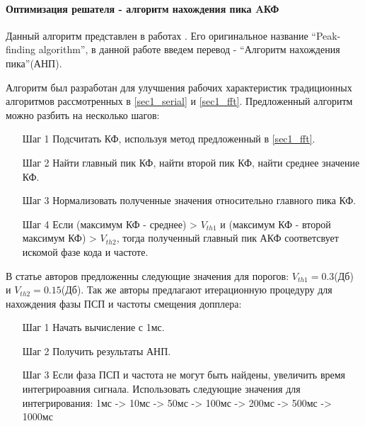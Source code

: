 \paragraph{Оптимизация решателя - алгоритм нахождения пика AКФ}

Данный алгоритм представлен в работах \cite{2max_ieee, 2max_article}. Его оригинальное название
\textquotedblleft{Peak-finding algorithm}\textquotedblright,
в данной работе введем перевод -
\textquotedblleft{Алгоритм нахождения пика}\textquotedblright (АНП). 

Алгоритм был разработан для улучшения рабочих характеристик традиционных алгоритмов рассмотренных в
\ref{sec1_serial} и \ref{sec1_fft}. Предложенный алгоритм можно разбить на несколько шагов:
\begin{itemize}
\item[Шаг 1] Подсчитать КФ, используя метод предложенный в \ref{sec1_fft}.
\item[Шаг 2] Найти главный пик КФ, найти второй пик КФ, найти среднее значение КФ.
\item[Шаг 3] Нормализовать полученные значения относительно главного пика КФ.
\item[Шаг 4] Если (максимум КФ - среднее) > ${V_{th1}}$ и (максимум КФ - 
	второй максимум КФ) > ${V_{th2}}$, тогда полученный главный пик АКФ соответсвует
	искомой фазе кода и частоте.
\end{itemize}

В статье авторов \cite{2max_ieee} предложенны следующие значения для порогов:
${V_{th1}} = 0.3$(Дб) и  ${V_{th2}} = 0.15$(Дб). Так же авторы предлагают итерационную процедуру для нахождения
фазы ПСП и частоты смещения допплера:
\begin{itemize}
\item[Шаг 1] Начать вычисление с 1мс.
\item[Шаг 2] Получить результаты АНП.
\item[Шаг 3] Если фаза ПСП и частота не могут быть найдены, увеличить время интегрироавния сигнала.
	Использовать следующие значения для интегрирования: 1мс -> 10мс -> 50мс -> 100мс -> 200мс ->
	500мс -> 1000мс
\end{itemize}



\newpage
